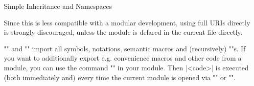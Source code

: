 \begin{sfragment}{Simple Inheritance and Namespaces}
\begin{dangerbox}
\begin{itemize}
     Since this is less compatible with a modular development, using full
     URIs directly is strongly discouraged, unless the module is delared in
     the current file directly.
 \end{itemize} 

  \end{dangerbox}

  \begin{function}{\STEXexport}
    \stexcode"\importmodule" and \stexcode"\usemodule" import
    all symbols, notations, semantic macros and (recursively)
    \stexcode"\importmodule"s. If you want to additionally
    export e.g. convenience macros and other code from a module,
    you can use the command \stexcode"" in your
    module. Then |<code>| is executed (both immediately and)
    every time the current module is opened via \stexcode"\importmodule"
    or \stexcode"\usemodule".
  \end{function}


\end{sfragment}